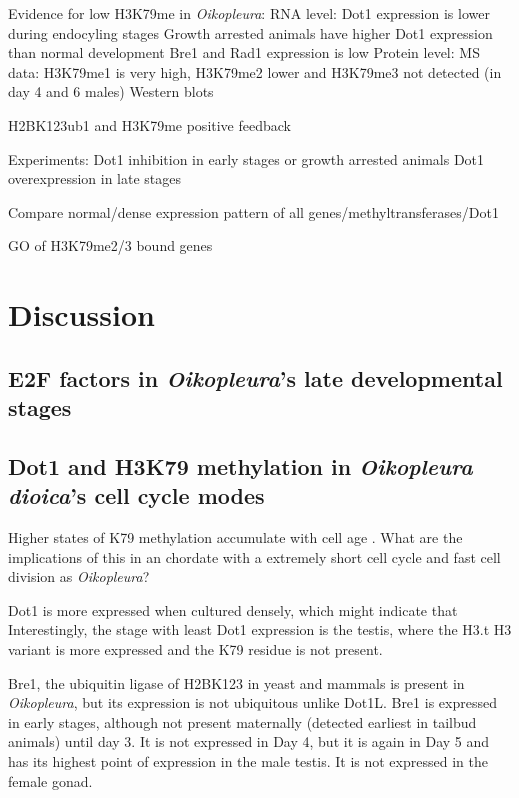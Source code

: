 \documentclass[11pt,twoside,a4paper]{report}
\begin{document}
Evidence for low H3K79me in \textit{Oikopleura}:
	RNA level:
		Dot1 expression is lower during endocyling stages
		Growth arrested animals have higher Dot1 expression than normal development
		Bre1 and Rad1 expression is low
	Protein level:
		MS data: H3K79me1 is very high, H3K79me2 lower and H3K79me3 not detected (in day 4 and 6 males)
		Western blots
		
H2BK123ub1 and H3K79me positive feedback


Experiments:
	Dot1 inhibition in early stages or growth arrested animals
	Dot1 overexpression in late stages
	
	Compare normal/dense expression pattern of all genes/methyltransferases/Dot1
	
	GO of H3K79me2/3 bound genes


\clearpage

\chapter{Discussion}

\section{E2F factors in \textit{Oikopleura}'s late developmental stages}


\section{Dot1 and H3K79 methylation in \textit{Oikopleura dioica}'s cell cycle modes}

Higher states of K79 methylation accumulate with cell age \cite{DeVos2011}. What are the implications of this in an chordate with a extremely short cell cycle and fast cell division as \textit{Oikopleura}?


Dot1 is more expressed when cultured densely, which might indicate that 
Interestingly, the stage with least Dot1 expression is the testis, where the H3.t H3 variant is more expressed and the K79 residue is not present.

Bre1, the ubiquitin ligase of H2BK123 in yeast and mammals is present in \textit{Oikopleura}, but its expression is not ubiquitous unlike Dot1L. Bre1 is expressed in early stages, although not present maternally (detected earliest in tailbud animals) until day 3. It is not expressed in Day 4, but it is again in Day 5 and has its highest point of expression in the male testis. It is not expressed in the female gonad.
\end{document}
